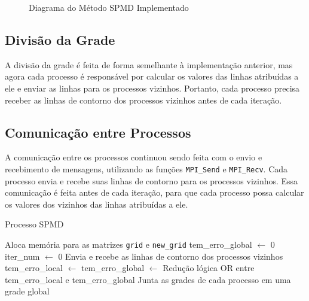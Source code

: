 \documentclass[conference]{IEEEtran}
\begin{document}
\begin{figure}[h]
    \centering
    \caption{Diagrama do Método SPMD Implementado}
    \label{fig:spmd}
\end{figure}

\subsection{Divisão da Grade}

A divisão da grade é feita de forma semelhante à implementação anterior, mas agora cada processo é responsável por calcular os valores das linhas atribuídas a ele e enviar as linhas para os processos vizinhos. Portanto, cada processo precisa receber as linhas de contorno dos processos vizinhos antes de cada iteração.

\subsection{Comunicação entre Processos}

A comunicação entre os processos continuou sendo feita com o envio e recebimento de mensagens, utilizando as funções \texttt{MPI\_Send} e \texttt{MPI\_Recv}. Cada processo envia e recebe suas linhas de contorno para os processos vizinhos. Essa comunicação é feita antes de cada iteração, para que cada processo possa calcular os valores dos vizinhos das linhas atribuídas a ele.

\begin{algorithm}[H]
    \caption{Processo SPMD}
    \begin{algorithmic}[1]
        \State Aloca memória para as matrizes \texttt{grid} e \texttt{new\_grid}
        \State tem\_erro\_global $\gets$ 0
        \State iter\_num $\gets$ 0
        \State Envia e recebe as linhas de contorno dos processos vizinhos
        \State tem\_erro\_local $\gets$ 
        \State tem\_erro\_global $\gets$ Redução lógica OR entre tem\_erro\_local e tem\_erro\_global
        \EndWhile
        \State Junta as grades de cada processo em uma grade global
        \State {}
        \EndIf
        \EndFunction
    \end{algorithmic}
    \label{alg:spmd}
\end{algorithm}
\end{document}

